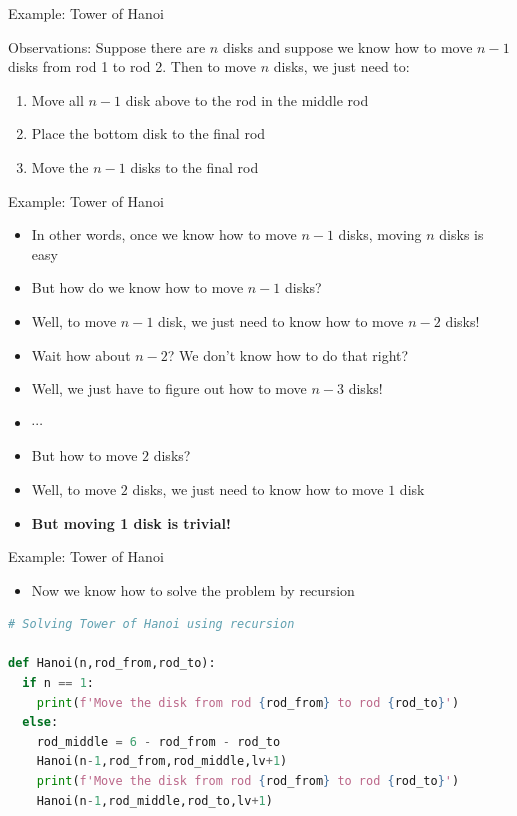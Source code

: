 \documentclass[10pt,xcolor={table,dvipsnames},t]{beamer}
\begin{document}
\begin{frame}{Example: Tower of Hanoi}
  \begin{exampleblock}{Observations:}
    Suppose there are $n$ disks and suppose we know how to move $n-1$ disks from rod 1 to rod 2. Then to move $n$ disks, we just need to:
    \begin{enumerate}
      \item Move all $n-1$ disk above to the rod in the middle rod
      \item Place the bottom disk to the final rod
      \item Move the $n-1$ disks to the final rod 
    \end{enumerate}
  \end{exampleblock}
\end{frame}

\begin{frame}{Example: Tower of Hanoi}
  \begin{itemize}
    \item In other words, once we know how to move $n-1$ disks, moving $n$ disks is easy
    \item But how do we know how to move $n-1$ disks?
    \item Well, to move $n-1$ disk, we just need to know how to move $n-2$ disks!
    \item Wait how about $n-2$? We don't know how to do that right?
    \item Well, we just have to figure out how to move $n-3$ disks!
    \item $\cdots$
    \item But how to move $2$ disks?
    \item Well, to move $2$ disks, we just need to know how to move $1$ disk
    \item \textbf{But moving 1 disk is trivial!}
  \end{itemize}
\end{frame}

\begin{frame}[fragile]{Example: Tower of Hanoi}
  \begin{itemize}
    \item Now we know how to solve the problem by recursion
  \end{itemize}
\begin{lstlisting}[language=python]
# Solving Tower of Hanoi using recursion 

def Hanoi(n,rod_from,rod_to):
  if n == 1:
    print(f'Move the disk from rod {rod_from} to rod {rod_to}')
  else:
    rod_middle = 6 - rod_from - rod_to
    Hanoi(n-1,rod_from,rod_middle,lv+1)
    print(f'Move the disk from rod {rod_from} to rod {rod_to}')
    Hanoi(n-1,rod_middle,rod_to,lv+1)
\end{lstlisting}
\end{frame}
\end{document}
